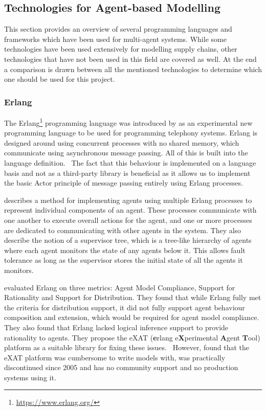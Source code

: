 \subsection{Technologies for Agent-based Modelling}

This section provides an overview of several programming languages and frameworks which have been used for multi-agent systems.
While some technologies have been used extensively for modelling supply chains, other technologies that have not been used in this field are covered as well.
At the end a comparison is drawn between all the mentioned technologies to determine which one should be used for this project.

\subsubsection{Erlang}

The Erlang\footnote{\url{https://www.erlang.org/}} programming language was introduced by  as an experimental new programming language to be used for programming telephony systems.
Erlang is designed around using concurrent processes with no shared memory, which communicate using asynchronous message passing.
All of this is built into the language definition.~\cite{armstrong2007history}
The fact that this behaviour is implemented on a language basis and not as a third-party library is beneficial as it allows us to implement the basic Actor principle of message passing entirely using Erlang processes.

 describes a method for implementing agents using multiple Erlang processes to represent individual components of an agent.
These processes communicate with one another to execute overall actions for the agent, and one or more processes are dedicated to communicating with other agents in the system.
They also describe the notion of a supervisor tree, which is a tree-like hierarchy of agents where each agent monitors the state of any agents below it.
This allows fault tolerance as long as the supervisor stores the initial state of all the agents it monitors.

 evaluated Erlang on three metrics: Agent Model Compliance, Support for Rationality and Support for Distribution.
They found that while Erlang fully met the criteria for distribution support, it did not fully support agent behaviour composition and extension, which would be required for agent model compliance.
They also found that Erlang lacked logical inference support to provide rationality to agents.
They propose the eXAT (\textbf{e}rlang e\textbf{X}perimental \textbf{A}gent \textbf{T}ool) platform as a suitable library for fixing these issues.~\cite{di2003exat}
However,  found that the eXAT platform was cumbersome to write models with, was practically discontinued since 2005 and has no community support and no production systems using it.

